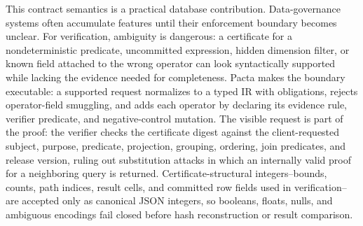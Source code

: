 \documentclass[conference]{IEEEtran}
\newcommand{\sys}{Pacta\xspace}
\begin{document}
This contract semantics is a practical database contribution. Data-governance systems often accumulate features until their enforcement boundary becomes unclear. For verification, ambiguity is dangerous: a certificate for a nondeterministic predicate, uncommitted expression, hidden dimension filter, or known field attached to the wrong operator can look syntactically supported while lacking the evidence needed for completeness. \sys makes the boundary executable: a supported request normalizes to a typed IR with obligations, rejects operator-field smuggling, and adds each operator by declaring its evidence rule, verifier predicate, and negative-control mutation. The visible request is part of the proof: the verifier checks the certificate digest against the client-requested subject, purpose, predicate, projection, grouping, ordering, join predicates, and release version, ruling out substitution attacks in which an internally valid proof for a neighboring query is returned. Certificate-structural integers--bounds, counts, path indices, result cells, and committed row fields used in verification--are accepted only as canonical JSON integers, so booleans, floats, nulls, and ambiguous encodings fail closed before hash reconstruction or result comparison.
\end{document}
